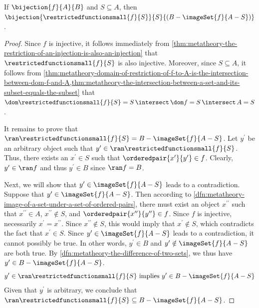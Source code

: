 \begin{thm}
     \label{thm:metatheory-restriction-of-a-bijection-to-a-subset-of-the-domain-of-the-function}
    If \( \bijection{f}{A}{B} \) and \( S \subseteq  A \), then \( \bijection{\restrictedfunctionsmall{f}{S}}{S}{\mleft( B - \imageSet{f}{A - S} \mright)} \).
\end{thm}

\begin{proof}
    Since \( f \) is injective, it follows immediately from \cref{thm:metatheory-the-restriction-of-an-injection-is-also-an-injection}
    that \( \restrictedfunctionsmall{f}{S} \) is also injective.
    Moreover, since \( S \subseteq  A \), it follows from
    \cref{thm:metatheory-domain-of-restriction-of-f-to-A-is-the-intersection-between-dom-f-and-A,thm:metatheory-the-intersection-between-a-set-and-its-subset-equals-the-subset}
    that \( \dom \restrictedfunctionsmall{f}{S} = S \,{\intersect}\, \dom f = S \,{\intersect}\, A = S \).

    \vspace{0.3cm}
    \noindent
    It remains to prove that \( \ran \restrictedfunctionsmall{f}{S} = B - \imageSet{f}{A - S} \).
    Let \( y^{\prime} \) be an arbitrary object such that \( y^{\prime} \in \ran \restrictedfunctionsmall{f}{S} \).
    Thus, there exists an \( x^{\prime} \in S \) such that \( \orderedpair{x^{\prime}}{y^{\prime}} \in f \).
    Clearly, \( y^{\prime} \in \ran f \) and thus \( y^{\prime} \in B \) since \( \ran f = B \).

    \vspace{0.3cm}
    \noindent
    Next, we will show that \( y^{\prime} \in \imageSet{f}{A - S} \) leads to a contradiction.
    Suppose that \( y^{\prime} \in \imageSet{f}{A - S} \).
    Then according to \cref{dfn:metatheory-image-of-a-set-under-a-set-of-ordered-pairs}, there must exist an object \( x^{\prime\prime} \)
    such that \( x^{\prime\prime} \in A \), \( x^{\prime\prime} \notin S \), and \( \orderedpair{x^{\prime\prime}}{y^{\prime\prime}} \in f \).
    Since \( f \) is injective, necessarily \( x^{\prime} = x^{\prime\prime} \).
    Since \( x^{\prime\prime} \notin S \), this would imply that \( x^{\prime} \notin S \), which contradicts the fact that \( x^{\prime} \in S \).
    Since \( y^{\prime} \in \imageSet{f}{A - S} \) leads to a contradiction, it cannot possibly be true.
    In other words, \( y^{\prime} \in B \) and \( y^{\prime} \notin \imageSet{f}{A - S} \) are both true.
    By \cref{dfn:metatheory-the-difference-of-two-sets}, we thus have \( y^{\prime} \in B - \imageSet{f}{A - S} \).
    \begin{equation*}
        y^{\prime} \in \ran \restrictedfunctionsmall{f}{S} \ \text{implies} \ y^{\prime} \in B - \imageSet{f}{A - S}
    \end{equation*}
    Given that \( y^{\prime} \) is arbitrary, we conclude that \( \ran \restrictedfunctionsmall{f}{S} \subseteq B - \imageSet{f}{A - S} \).


\end{proof}

